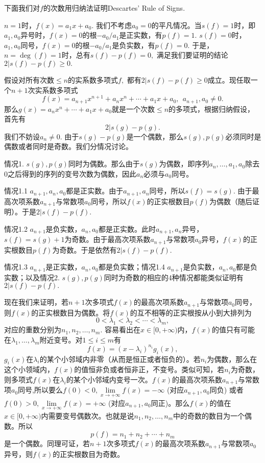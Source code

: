 \vspace{0.5em}

下面我们对$f$的次数用归纳法证明Descartes' Rule of Signs.

$n = 1$时，$f(x) = a_1 x + a_0.$ 我们不考虑$a_0 = 0$的平凡情况。当$s(f) = 1$时，即$a_1, a_0$异号时，$f(x) = 0$的根$-a_0 / a_1$是正实数，有$p(f) = 1.$ $s(f) = 0$时，$a_1, a_0$同号，$f(x) = 0$的根$-a_0 / a_1$是负实数，有$p(f) = 0.$ 于是，$n = \deg(f) = 1$时，总有$s(f) - p(f) = 0,$ 满足我们要证明的结论$2 | s(f) - p(f) \geqslant 0.$

假设对所有次数$\leqslant n$的实系数多项式$f,$ 都有$2 | s(f) - p(f) \geqslant 0$成立。现任取一个$n+1$次实系数多项式
$$f(x) = a_{n+1}x^{n+1} + a_nx^n + \cdots + a_1x + a_0, ~~ a_{n+1}, a_0 \neq 0.$$
那么$g(x) = a_nx^n + \cdots + a_1x + a_0$就是一个次数$\leqslant n$的多项式，根据归纳假设，首先有
$$2 | s(g) - p(g).$$
我们不妨设$a_n \neq 0.$ 由于$s(g) - p(g)$是一个偶数，那么$s(g), p(g)$必须同时是偶数或者同时是奇数。我们分情况讨论。

情况1. $s(g), p(g)$同时为偶数。那么由于$s(g)$为偶数，即序列$a_n, \ldots, a_1, a_0$除去0之后得到的序列的变号次数为偶数，因此$a_n$必须与$a_0$同号。

情况1.1 $a_{n+1}, a_n, a_0$都是正实数。由于$a_{n+1}, a_n$同号，所以$s(f) = s(g).$ 由于最高次项系数$a_{n+1}$与常数项$a_0$同号，所以$f(x)$的正实根数目$p(f)$为偶数（随后证明）。于是$2 | s(f) - p(f).$

情况1.2 $a_{n+1}$是负实数，$a_n, a_0$都是正实数。此时$a_{n+1}, a_n$异号，$s(f) = s(g) + 1$为奇数。由于最高次项系数$a_{n+1}$与常数项$a_0$异号，$f(x)$的正实根数目$p(f)$为奇数。于是依然有$2 | s(f) - p(f).$

情况1.3 $a_{n+1}$是正实数，$a_n, a_0$都是负实数；情况1.4 $a_{n+1}$是负实数，$a_n, a_0$都是负实数；以及情况2. $s(g), p(g)$同时为奇数的相应的4种情况都能类似证明有$2 | s(f) - p(f).$

现在我们来证明，若$n+1$次多项式$f(x)$的最高次项系数$a_{n+1}$与常数项$a_0$同号，则$f(x)$的正实根数目为偶数。将$f(x)$的互不相等的正实根按从小到大排列为
$$0 < \lambda_1 < \lambda_2 < \cdots < \lambda_m,$$
对应的重数分别为$n_1, n_2, \ldots, n_m.$ 容易看出在$x \in [0, +\infty)$内，$f(x)$的值只有可能在$\lambda_1, \ldots, \lambda_m$附近变号。对$1 \leqslant i \leqslant m$有
$$f(x) = (x - \lambda_i)^{n_i} g_i(x),$$
$g_i(x)$在$\lambda_i$的某个小邻域内非零（从而是恒正或者恒负的）。若$n_i$为偶数，那么在这个小领域内，$f(x)$的值恒非负或者恒非正，不变号。类似可知，若$n_i$为奇数，则多项式$f(x)$在$\lambda_i$的某个小邻域内变号一次。$f(x)$的最高次项系数$a_{n+1}$与常数项$a_0$同号,所以要么$f(0) < 0, \lim\limits_{x\to+\infty} f(x) = -\infty$ (对应$a_{n+1}, a_0$同负) 或者$f(0) > 0, \lim\limits_{x\to+\infty} f(x) = +\infty$ (对应$a_{n+1}, a_0$同正)。那么$f(x)$的值在$x \in [0, +\infty)$内需要变号偶数次。也就是说$n_1, n_2, \ldots, n_m$中的奇数的数目为一个偶数。所以
$$p(f) = n_1 + n_2 + \cdots + n_m$$
是一个偶数。同理可证，若$n+1$次多项式$f(x)$的最高次项系数$a_{n+1}$与常数项$a_0$异号，则$f(x)$的正实根数目为奇数。

